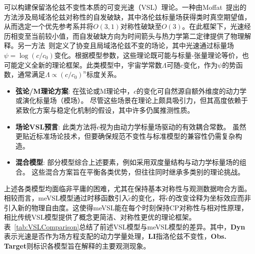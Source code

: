 \documentclass[jkps,preprint,fleqn]{revtex4}
\newcommand{\tc}{\tilde{c}}
\begin{document}
可以构建保留洛伦兹不变性本质的可变光速（VSL）理论。一种由Moffat~\cite{Moffat:1992ud}提出的方法涉及局域洛伦兹对称性的自发破缺，其中洛伦兹标量场获得类时真空期望值，从而选定一个优先参考系并将$O(3,1)$对称性破缺至$O(3)$。在此框架下，光速经历相变至当前较小值，而自发破缺方向为时间箭头与热力学第二定律提供了物理解释。另一方法~\cite{Magueijo:2000zt}则定义了协变且局域洛伦兹不变的场论，其中光速通过标量场$\psi = \log(c/c_0)$变化。根据模型参数，这些理论既可能与标量-张量理论等价，也可能定义全新的理论框架。此类模型中，宇宙学常数$\Lambda$可随$c$变化，作为$\psi$的势函数，通常满足$\Lambda \propto (c/c_0)^n$标度关系\cite{Manida:1999rx,Barrow:1999st,Stepanov:1999ax,Magueijo:2000au,Moffat:2002nm}。

\begin{itemize}
  \item \textbf{弦论/M理论方案}:
    在弦论或M理论中，$c$的变化可自然源自额外维度的动力学或演化标量场（模场）\cite{Kaelbermann:1998hu,Randall:1999ee,Randall:1999vf,Kiritsis:1999tx,Chung:1999xg,Alexander:1999cb,Ishihara:2000nf,Csaki:2000dm,Youm:2001sw,Youm:2001zk,Grojean:2001pv,Youm:2001zp}。
    尽管这些场景在理论上颇具吸引力，但其高度依赖于紧致化方案与稳定化机制的假设，其中许多仍属推测性质。
   \item \textbf{场论VSL预言}:
    此类方法将$c$视为由动力学标量场驱动的有效耦合常数\cite{Drummond:1979pp,Novello:1988ma,Barton:1989dq,Scharnhorst:1990sr,Shore:1995fz,Colladay:1995qb,Coleman:1998ti,Bertolami:1999da,Shore:2000bs,Greenberg:2002uu,Teyssandier:2003qh,Shore:2003zc,Blasone:2003wf}。
    虽然更贴近标准场论技术，但要确保规范不变性与标准模型的兼容性仍需复杂构造。
    \item \textbf{混合模型}:
    部分模型综合上述要素，例如采用双度量结构与动力学标量场的组合\cite{Alexander:2001dr,Burgess:2002tb}。
    这些混合方案旨在平衡各类优势，但往往同时继承多类别的理论挑战。
\end{itemize}

上述各类模型均面临非平庸的困难，尤其在保持基本对称性与观测数据吻合方面。相较而言，meVSL模型通过时移函数引入$\tc$的变化，将$\tc$的改变诠释为坐标效应而非引入新的物理自由度。这使得meVSL能在每个时刻保持CP对称性与相对性原理，相比传统VSL模型提供了概念更简洁、对称性更优的理论框架。表~\ref{tab:VSLComparison}总结了前述VSL模型与meVSL模型的差异。其中，\textbf{Dyn}表示光速是否作为场方程支配的动力学量处理，\textbf{LI}指洛伦兹不变性，\textbf{Obs. Target}则标识各模型旨在解释的主要观测现象。
\end{document}
